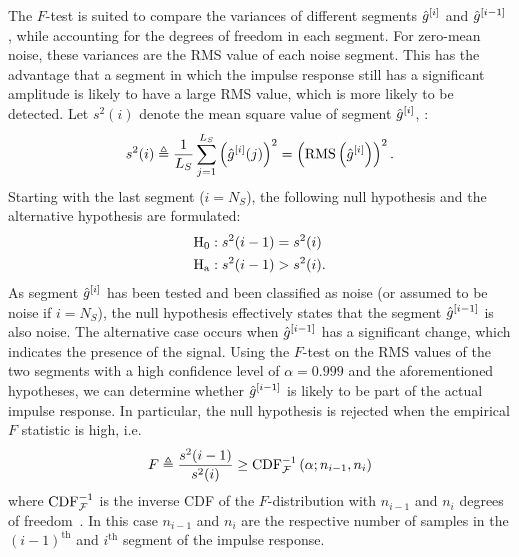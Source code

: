 \begin{enumerate}
  The $F$-test is suited to compare the variances of different segments ${\hat{g}}^{[i]}$ and ${\hat{g}}^{[i-1]}$ \citep{Parsons1974}, while accounting for the degrees of freedom in each segment.
  For zero-mean noise, these variances are the \gls{RMS} value of each noise segment.
  This has the advantage that a segment in which the impulse response still has a significant amplitude is likely to have a large \gls{RMS} value, which is more likely to be detected.
  Let $s^2(i)$ denote the mean square value of segment ${\hat{g}}^{[i]}$, :
  \begin{equation}
    s^2(i) 
    \triangleq \frac{1}{L_S} \sum_{j=1}^{L_S} \left({\hat{g}}^{[i]}(j)\right)^2
    = \left( \operatorname{RMS} \left( \hat{g}^{[i]} \right) \right)^2
           \text{.}
  \end{equation}
  Starting with the last segment ($i = N_S$), the following null hypothesis and the alternative hypothesis are formulated:
  \begin{align}
     \mathrm{H}_{\mathrm{0}} &: s^2(i-1) = s^2(i)\\
     \mathrm{H}_{\mathrm{a}}    &: s^2(i-1) > s^2(i)
     \text{.}
  \end{align}
  As segment ${\hat{g}}^{[i]}$ has been tested and been classified as noise (or assumed to be noise if $i=N_S$), the null hypothesis effectively states that the segment ${\hat{g}}^{[i-1]}$ is also noise.
  The alternative case occurs when ${\hat{g}}^{[i-1]}$ has a significant change, which indicates the presence of the signal.
  Using the $F$-test on the \gls{RMS} values of the two segments with a high confidence level of $\alpha=0.999$ and the aforementioned hypotheses, we can determine whether ${\hat{g}}^{[i-1]}$ is likely to be part of the actual impulse response.
  In particular, the null hypothesis is rejected when the empirical $F$ statistic is high, i.e.
  \begin{equation}
    F \triangleq \frac{s^2(i-1)}{s^2(i)} \geq \mathrm{CDF}^{-1}_{\operatorname{\mathcal{F}}} \left( \alpha; n_{i-1}, n_{i} \right)
  \end{equation}
  where $ \mathrm{CDF}^{-1}_{\operatorname{\mathcal{F}}}$ is the inverse \gls{CDF} of the \mbox{$F$-distribution} with $n_{i-1}$ and $n_{i}$ degrees of freedom~\citep{EncyclopediaOfMathematics}.
  In this case $n_{i-1}$ and $n_{i}$ are the respective number of samples in the $(i-1)^{\text{th}}$ and $i^{\text{th}}$ segment of the impulse response.


\end{enumerate}
